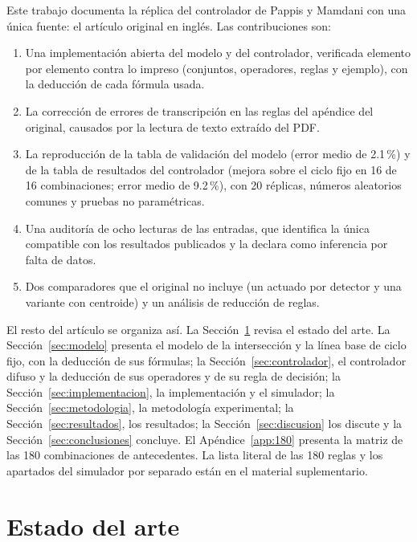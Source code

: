 \documentclass[journal]{IEEEtran}
\begin{document}
Este trabajo documenta la réplica del controlador de Pappis y Mamdani con una única fuente: el artículo original en inglés. Las contribuciones son:
\begin{enumerate}
\item Una implementación abierta del modelo y del controlador, verificada elemento por elemento contra lo impreso (conjuntos, operadores, reglas y ejemplo), con la deducción de cada fórmula usada.
\item La corrección de errores de transcripción en las reglas del apéndice del original, causados por la lectura de texto extraído del PDF.
\item La reproducción de la tabla de validación del modelo (error medio de 2.1\,\%) y de la tabla de resultados del controlador (mejora sobre el ciclo fijo en 16 de 16 combinaciones; error medio de 9.2\,\%), con 20 réplicas, números aleatorios comunes y pruebas no paramétricas.
\item Una auditoría de ocho lecturas de las entradas, que identifica la única compatible con los resultados publicados y la declara como inferencia por falta de datos.
\item Dos comparadores que el original no incluye (un actuado por detector y una variante con centroide) y un análisis de reducción de reglas.
\end{enumerate}

El resto del artículo se organiza así. La Sección~\ref{sec:sota} revisa el estado del arte. La Sección~\ref{sec:modelo} presenta el modelo de la intersección y la línea base de ciclo fijo, con la deducción de sus fórmulas; la Sección~\ref{sec:controlador}, el controlador difuso y la deducción de sus operadores y de su regla de decisión; la Sección~\ref{sec:implementacion}, la implementación y el simulador; la Sección~\ref{sec:metodologia}, la metodología experimental; la Sección~\ref{sec:resultados}, los resultados; la Sección~\ref{sec:discusion} los discute y la Sección~\ref{sec:conclusiones} concluye. El Apéndice~\ref{app:180} presenta la matriz de las 180 combinaciones de antecedentes. La lista literal de las 180 reglas y los apartados del simulador por separado están en el material suplementario.

\section{Estado del arte}
\label{sec:sota}
\end{document}
